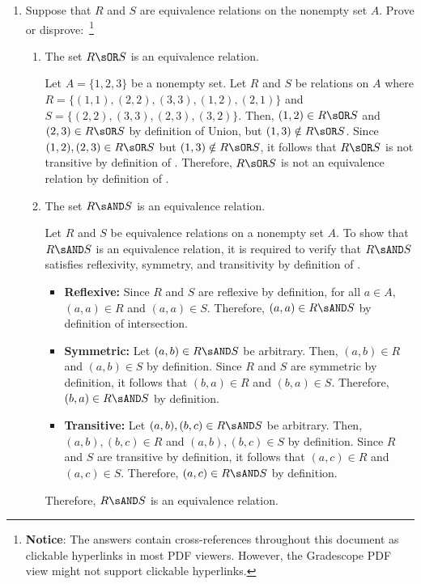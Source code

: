 \begin{enumerate}
  

  \newpage

  \item Suppose that $R$ and $S$ are equivalence relations on the nonempty set $A$. Prove or disprove:~\footnote{
    \textbf{Notice}: The answers contain cross-references throughout this document as clickable hyperlinks in most PDF viewers. 
    However, the Gradescope PDF view might not support clickable hyperlinks.
  }
  \begin{enumerate}
    \item The set $R \sOR S$ is an equivalence relation.
      \begin{subdisprove}
        Let $A = \{1,2,3\}$ be a nonempty set. Let $R$ and $S$ be relations on $A$ where
        $R = \{(1,1),(2,2),(3,3),(1,2),(2,1)\}$ and
        $S = \{(2,2),(3,3),(2,3),(3,2)\}$. 
        Then, $(1,2) \in R \sOR S$ and $(2,3) \in R \sOR S$ by definition of Union, 
        but $(1,3) \notin R \sOR S$. 
        Since $(1,2), (2,3) \in R \sOR S$ but $(1,3) \notin R \sOR S$, 
        it follows that $R \sOR S$ is not transitive by definition of .
        Therefore, $R \sOR S$ is not an equivalence relation by definition of .
      \end{subdisprove}
    \item The set $R \sAND S$ is an equivalence relation.
      \begin{subprove}
        Let $R$ and $S$ be equivalence relations on a nonempty set $A$. 
        To show that $R \sAND S$ is an equivalence relation, it is required to verify that $R \sAND S$ satisfies reflexivity, symmetry, and transitivity by definition of .
        \begin{itemize}
          \item \textbf{Reflexive:} Since $R$ and $S$ are reflexive by definition, 
          for all $a \in A$, $(a,a) \in R$ and $(a,a) \in S$. 
          Therefore, $(a,a) \in R \sAND S$ by definition of intersection.
          \item \textbf{Symmetric:} Let $(a,b) \in R \sAND S$ be arbitrary. Then, $(a,b) \in R$ and $(a,b) \in S$ by definition. 
          Since $R$ and $S$ are symmetric by definition, it follows that $(b,a) \in R$ and $(b,a) \in S$. 
          Therefore, $(b,a) \in R \sAND S$ by definition.
          \item \textbf{Transitive:} Let $(a,b), (b,c) \in R \sAND S$ be arbitrary. Then, $(a,b), (b,c) \in R$ and $(a,b), (b,c) \in S$ by definition. 
          Since $R$ and $S$ are transitive by definition, it follows that $(a,c) \in R$ and $(a,c) \in S$. 
          Therefore, $(a,c) \in R \sAND S$ by definition.
        \end{itemize}
        Therefore, $R \sAND S$ is an equivalence relation.
      \end{subprove}
  \end{enumerate}










\end{enumerate}
